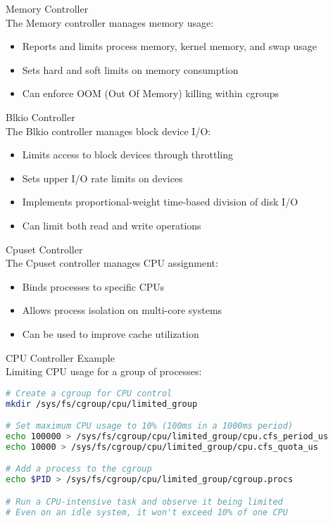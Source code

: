 \begin{definition}{Memory Controller}\\
    The Memory controller manages memory usage:
    \begin{itemize}
        \item Reports and limits process memory, kernel memory, and swap usage
        \item Sets hard and soft limits on memory consumption
        \item Can enforce OOM (Out Of Memory) killing within cgroups
    \end{itemize}
\end{definition}

\begin{definition}{Blkio Controller}\\
    The Blkio controller manages block device I/O:
    \begin{itemize}
        \item Limits access to block devices through throttling
        \item Sets upper I/O rate limits on devices
        \item Implements proportional-weight time-based division of disk I/O
        \item Can limit both read and write operations
    \end{itemize}
\end{definition}

\begin{definition}{Cpuset Controller}\\
    The Cpuset controller manages CPU assignment:
    \begin{itemize}
        \item Binds processes to specific CPUs
        \item Allows process isolation on multi-core systems
        \item Can be used to improve cache utilization
    \end{itemize}
\end{definition}

\begin{example2}{CPU Controller Example}\\
    Limiting CPU usage for a group of processes:
    
\begin{lstlisting}[language=bash, style=basesmol]
# Create a cgroup for CPU control
mkdir /sys/fs/cgroup/cpu/limited_group

# Set maximum CPU usage to 10% (100ms in a 1000ms period)
echo 100000 > /sys/fs/cgroup/cpu/limited_group/cpu.cfs_period_us
echo 10000 > /sys/fs/cgroup/cpu/limited_group/cpu.cfs_quota_us

# Add a process to the cgroup
echo $PID > /sys/fs/cgroup/cpu/limited_group/cgroup.procs

# Run a CPU-intensive task and observe it being limited
# Even on an idle system, it won't exceed 10% of one CPU
\end{lstlisting}
\end{example2}


